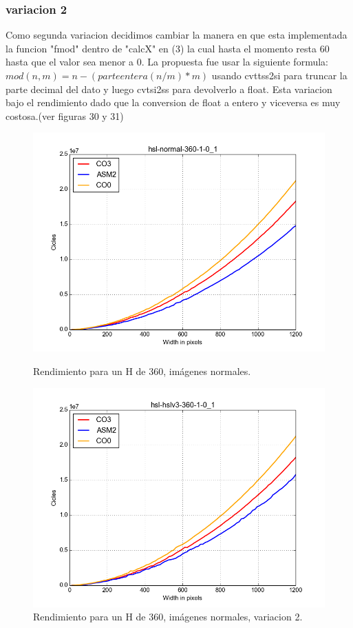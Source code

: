 \documentclass[a4paper]{article}
\begin{document}
\subsubsection{variacion 2}
Como segunda variacion decidimos cambiar la manera en que esta implementada la funcion "fmod" dentro de "calcX" en (3) la cual hasta el momento resta 60 hasta que el valor sea menor a 0. La propuesta fue usar la siguiente formula: $mod(n, m) = n - ( parteentera(n/m) * m )$ usando cvttss2si para truncar la parte decimal del dato y luego cvtsi2ss para devolverlo a float. Esta variacion bajo el rendimiento dado que la conversion de float a entero y viceversa es muy costosa.(ver figuras 30 y 31)

\begin{figure}[H]
  \begin{center}
    \includegraphics[scale=0.4]{imagenes/hsl5.png}
    \caption{Rendimiento para un H de 360, imágenes normales.}
    \label{fig:exp1-1}
  \end{center}
  \endminipage\hfill
  \begin{center}
    \includegraphics[scale=0.4]{imagenes/hsl9.png}
    \caption{Rendimiento para un H de 360, imágenes normales, variacion 2.}
    \label{fig:exp1-0.5}
  \end{center}
  \endminipage\hfill
\end{figure}
\end{document}

